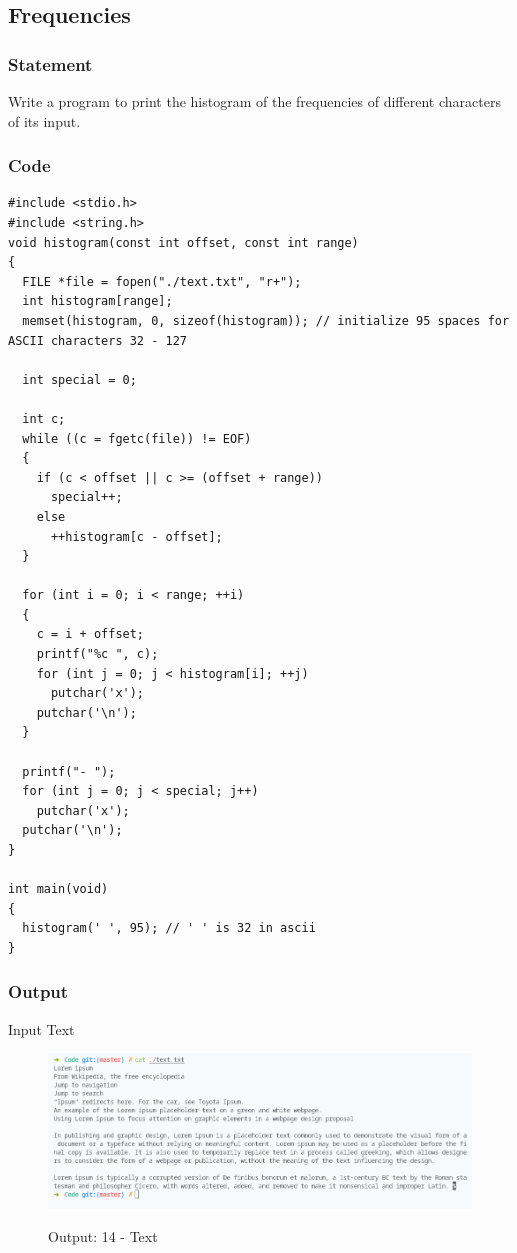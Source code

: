 \pagebreak
\subsection{Frequencies}
\subsubsection{Statement}
Write a program to print the histogram of the frequencies of different characters of its input.
\subsubsection{Code}
\begin{verbatim} 
#include <stdio.h>
#include <string.h>
void histogram(const int offset, const int range)
{
  FILE *file = fopen("./text.txt", "r+");
  int histogram[range];
  memset(histogram, 0, sizeof(histogram)); // initialize 95 spaces for ASCII characters 32 - 127

  int special = 0;

  int c;
  while ((c = fgetc(file)) != EOF)
  {
    if (c < offset || c >= (offset + range))
      special++;
    else
      ++histogram[c - offset];
  }

  for (int i = 0; i < range; ++i)
  {
    c = i + offset;
    printf("%c ", c);
    for (int j = 0; j < histogram[i]; ++j)
      putchar('x');
    putchar('\n');
  }

  printf("- ");
  for (int j = 0; j < special; j++)
    putchar('x');
  putchar('\n');
}

int main(void)
{
  histogram(' ', 95); // ' ' is 32 in ascii
}
\end{verbatim}
\pagebreak
\subsubsection{Output}
Input Text
\begin{figure}[!htb]
  \centering
  \includegraphics[width=6in]{Images/text.png}
  \label{output:14-Text}
  \caption{Output: 14 - Text}
\end{figure}

